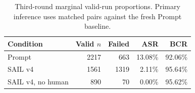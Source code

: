 \begin{table}[t]
\centering
\caption{Third-round marginal valid-run proportions. Primary inference uses matched pairs against the fresh Prompt baseline.}
\label{tab:sail_v4_matched_main}
\setlength{\tabcolsep}{3pt}
\begin{tabular}{lrrrr}
\toprule
Condition & Valid $n$ & Failed & ASR & BCR \\
\midrule
Prompt & 2217 & 663 & 13.08\% & 92.06\% \\
SAIL v4 & 1561 & 1319 & 2.11\% & 95.64\% \\
SAIL v4, no human & 890 & 70 & 0.00\% & 95.62\% \\
\bottomrule
\end{tabular}
\end{table}

